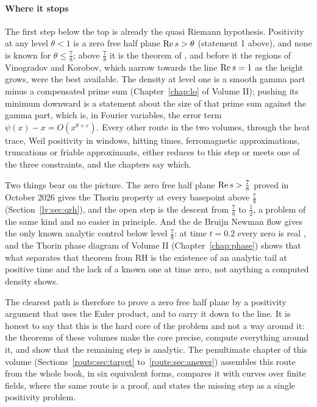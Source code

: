 \paragraph{Where it stops} The first step below the top is already the quasi Riemann hypothesis. Positivity at any level $\theta<1$ is a zero free half plane $\operatorname{Re} s>\theta$ (statement 1 above), and none is known for $\theta\le\frac78$; above $\frac78$ it is the theorem of \cite{OAI26a}, and before it the regions of Vinogradov and Korobov, which narrow towards the line $\operatorname{Re} s=1$ as the height grows, were the best available. The density at level one is a smooth gamma part minus a compensated prime sum (Chapter~\ref{chap:lo} of Volume II); pushing its minimum downward is a statement about the size of that prime sum against the gamma part, which is, in Fourier variables, the error term $\psi(x)-x=O(x^{\theta+\varepsilon})$. Every other route in the two volumes, through the heat trace, Weil positivity in windows, hitting times, ferromagnetic approximations, truncations or friable approximants, either reduces to this step or meets one of the three constraints, and the chapters say which.

Two things bear on the picture. The zero free half plane $\operatorname{Re} s>\frac78$ proved in October 2026 \cite{OAI26a} gives the Thorin property at every basepoint above $\frac78$ (Section~\ref{lv:sec:qrh}), and the open step is the descent from $\frac78$ to $\frac12$, a problem of the same kind and no easier in principle. And the de Bruijn Newman flow gives the only known analytic control below level $\frac78$: at time $t=0.2$ every zero is real \cite{PT21}, and the Thorin phase diagram of Volume II (Chapter~\ref{chap:phase}) shows that what separates that theorem from RH is the existence of an analytic tail at positive time and the lack of a known one at time zero, not anything a computed density shows.

The clearest path is therefore to prove a zero free half plane by a positivity argument that uses the Euler product, and to carry it down to the line. It is honest to say that this is the hard core of the problem and not a way around it: the theorems of these volumes make the core precise, compute everything around it, and show that the remaining step is analytic. The penultimate chapter of this volume (Sections~\ref{route:sec:target} to~\ref{route:sec:answer}) assembles this route from the whole book, in six equivalent forms, compares it with curves over finite fields, where the same route is a proof, and states the missing step as a single positivity problem.
